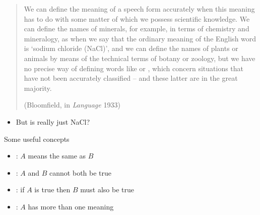 \documentclass[a4paper,landscape,headrule,footrule,xetex,25pt]{foils}
\begin{document}
\begin{quotation}
  We can define the meaning of a speech form accurately when this
  meaning has to do with some matter of which we possess scientific
  knowledge. We can define the names of minerals, for example, in
  terms of chemistry and mineralogy, as when we say that the ordinary
  meaning of the English word  is `sodium chloride (NaCl)', and we
  can define the names of plants or animals by means of the technical
  terms of botany or zoology, but we have no precise way of defining
  words like  or , which concern situations that have not been
  accurately classified – and these latter are in the great majority.
				
\hfill				(Bloomfield, in \textit{Language} 1933)
\end{quotation}

\begin{itemize}
\item But is  really just NaCl?
\end{itemize}


Some useful concepts

\begin{itemize}
\item {}: $A$ means the same as $B$
\item {}:  $A$ and $B$ cannot both be true
\item {}: if  $A$ is true then  $B$ must also be true
\item {}: $A$ has more than one meaning
\end{itemize}
\end{document}
